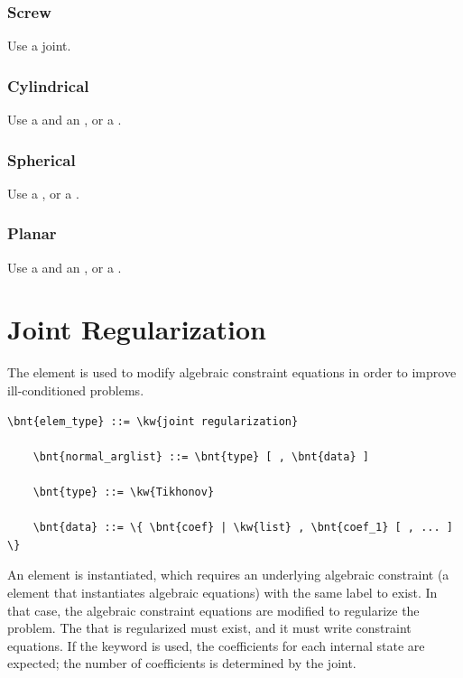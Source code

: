 \subsubsection{Screw}
Use a  joint.

\subsubsection{Cylindrical}
Use a  and an , or a .

\subsubsection{Spherical}
Use a , or a .

\subsubsection{Planar}
Use a  and an , or a .




\section{Joint Regularization}
The  element is used to modify
algebraic constraint equations in order to improve ill-conditioned
problems.

\begin{Verbatim}[commandchars=\\\{\}]
    \bnt{elem_type} ::= \kw{joint regularization}

    \bnt{normal_arglist} ::= \bnt{type} [ , \bnt{data} ]

    \bnt{type} ::= \kw{Tikhonov}

    \bnt{data} ::= \{ \bnt{coef} | \kw{list} , \bnt{coef_1} [ , ... ] \}
\end{Verbatim}
An element is instantiated, which requires
an underlying algebraic constraint (a  element
that instantiates algebraic equations) with the same label to exist.
In that case, the algebraic constraint equations are modified
to regularize the problem.
The  that is regularized must exist,
and it must write constraint equations.
If the keyword  is used, the coefficients for each internal state
are expected; the number of coefficients is determined by the joint.

